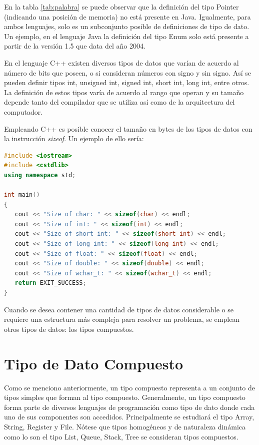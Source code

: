 En la tabla \ref{tab:palabra} se puede observar que la definición del tipo Pointer (indicando una posición de memoria) no está presente en Java. Igualmente, para ambos lenguajes, solo es un subconjunto posible de definiciones de tipo de dato. Un ejemplo, en el lenguaje Java la definición del tipo Enum solo está presente a partir de la versión 1.5 que data del año 2004.

En el lenguaje C++ existen diversos tipos de datos que varían de acuerdo al número de bits que poseen, o si consideran números con signo y sin signo. Así se pueden definir tipos int, unsigned int, signed int, short int, long int, entre otros. La definición de estos tipos varía de acuerdo al rango que operan y su tamaño depende tanto del compilador que se utiliza así como de la arquitectura del computador.

Empleando C++ es posible conocer el tamaño en bytes de los tipos de datos con la instrucción \textit{sizeof}. Un ejemplo de ello sería:
\begin{lstlisting}[upquote=true, language=C++]
#include <iostream>
#include <cstdlib>
using namespace std;

int main()
{
   cout << "Size of char: " << sizeof(char) << endl;
   cout << "Size of int: " << sizeof(int) << endl;
   cout << "Size of short int: " << sizeof(short int) << endl;
   cout << "Size of long int: " << sizeof(long int) << endl;
   cout << "Size of float: " << sizeof(float) << endl;
   cout << "Size of double: " << sizeof(double) << endl;
   cout << "Size of wchar_t: " << sizeof(wchar_t) << endl;
   return EXIT_SUCCESS;
}
\end{lstlisting}

Cuando se desea contener una cantidad de tipos de datos considerable o se requiere una estructura más compleja para resolver un problema, se emplean otros tipos de datos: los tipos compuestos.

\section{Tipo de Dato Compuesto}

Como se menciono anteriormente, un tipo compuesto representa a un conjunto de tipos simples que forman al tipo compuesto. Generalmente, un tipo compuesto forma parte de diversos lenguajes de programación como tipo de dato donde cada uno de sus componentes son accedidos. Principalmente se estudiará el tipo Array, String, Register y File. Nótese que tipos homogéneos y de naturaleza dinámica como lo son el tipo List, Queue, Stack, Tree se consideran tipos compuestos.

